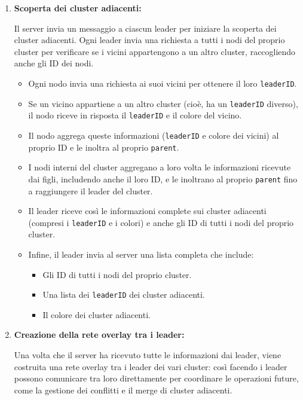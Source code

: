 \documentclass[12pt, a4paper]{report}
\begin{document}
\begin{enumerate}
    \item \textbf{Scoperta dei cluster adiacenti:}

    Il server invia un messaggio a ciascun leader per iniziare la scoperta dei cluster adiacenti. Ogni leader invia una richiesta a tutti i nodi del proprio cluster per verificare se i vicini appartengono a un altro cluster, raccogliendo anche gli ID dei nodi.

    \begin{itemize} 
        \item Ogni nodo invia una richiesta ai suoi vicini per ottenere il loro \texttt{leaderID}.
        \item Se un vicino appartiene a un altro cluster (cio\`e, ha un \texttt{leaderID} diverso), il nodo riceve in risposta il \texttt{leaderID} e il colore del vicino. 
        \item Il nodo aggrega queste informazioni (\texttt{leaderID} e colore dei vicini) al proprio ID e le inoltra al proprio \texttt{parent}. 
        \item I nodi interni del cluster aggregano a loro volta le informazioni ricevute dai figli, includendo anche il loro ID, e le inoltrano al proprio \texttt{parent} fino a raggiungere il leader del cluster.
        \item Il leader riceve così le informazioni complete sui cluster adiacenti (compresi i \texttt{leaderID} e i colori) e anche gli ID di tutti i nodi del proprio cluster. 
        \item Infine, il leader invia al server una lista completa che include: 
        \begin{itemize} 
            \item Gli ID di tutti i nodi del proprio cluster. 
            \item Una lista dei \texttt{leaderID} dei cluster adiacenti. 
            \item Il colore dei cluster adiacenti. 
        \end{itemize} 
    \end{itemize}

    \item \textbf{Creazione della rete overlay tra i leader:}

    Una volta che il server ha ricevuto tutte le informazioni dai leader, viene costruita una rete overlay tra i leader dei vari cluster: così facendo i leader possono comunicare tra loro direttamente per coordinare le operazioni future, come la gestione dei conflitti e il merge di cluster adiacenti.


\end{enumerate}
\end{document}
